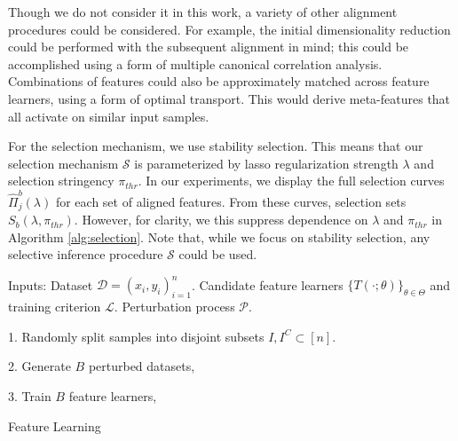 Though we do not consider it in this work, a variety of other alignment
procedures could be considered. For example, the initial dimensionality
reduction could be performed with the subsequent alignment in mind; this could
be accomplished using a form of multiple canonical correlation analysis.
Combinations of features could also be approximately matched across feature
learners, using a form of optimal transport. This would derive meta-features
that all activate on similar input samples.

For the selection mechanism, we use stability selection. This means that our
selection mechanism $\mathcal{S}$ is parameterized by lasso regularization
strength $\lambda$ and selection stringency $\pi_{thr}$. In our experiments, we
display the full selection curves $\hat{\Pi}^{b}_{j}\left(\lambda\right)$ for
each set of aligned features. From these curves, selection sets
$S_{b}\left(\lambda, \pi_{thr}\right)$. However, for clarity, we this suppress
dependence on $\lambda$ and $\pi_{thr}$ in Algorithm \ref{alg:selection}. Note
that, while we focus on stability selection, any selective inference procedure
$\mathcal{S}$ could be used.

\begin{algorithm}[H]
\SetAlgoLined
{}
Inputs: Dataset $\mathcal{D} = \left(x_{i}, y_{i}\right)_{i = 1}^{n}$. Candidate
feature learners $\{T\left(\cdot; \theta\right)\}_{\theta \in \Theta}$ and
training criterion $\mathcal{L}$. Perturbation process $\mathcal{P}$.

1. Randomly split samples into disjoint subsets $I, I^{C} \subset \left[n\right]$.

2. Generate $B$ perturbed datasets,


3. Train $B$ feature learners,

\caption{Feature Learning}
\label{alg:features}
\end{algorithm}

